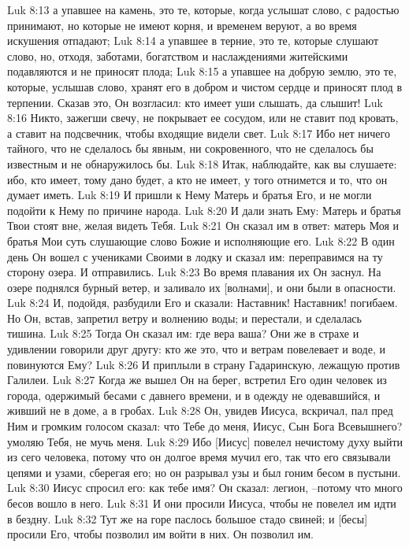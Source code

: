 Luk 8:13  а упавшее на камень, это те, которые, когда услышат слово, с радостью принимают, но которые не имеют корня, и временем веруют, а во время искушения отпадают;
Luk 8:14  а упавшее в терние, это те, которые слушают слово, но, отходя, заботами, богатством и наслаждениями житейскими подавляются и не приносят плода;
Luk 8:15  а упавшее на добрую землю, это те, которые, услышав слово, хранят его в добром и чистом сердце и приносят плод в терпении. Сказав это, Он возгласил: кто имеет уши слышать, да слышит!
Luk 8:16  Никто, зажегши свечу, не покрывает ее сосудом, или не ставит под кровать, а ставит на подсвечник, чтобы входящие видели свет.
Luk 8:17  Ибо нет ничего тайного, что не сделалось бы явным, ни сокровенного, что не сделалось бы известным и не обнаружилось бы.
Luk 8:18  Итак, наблюдайте, как вы слушаете: ибо, кто имеет, тому дано будет, а кто не имеет, у того отнимется и то, что он думает иметь.
Luk 8:19  И пришли к Нему Матерь и братья Его, и не могли подойти к Нему по причине народа.
Luk 8:20  И дали знать Ему: Матерь и братья Твои стоят вне, желая видеть Тебя.
Luk 8:21  Он сказал им в ответ: матерь Моя и братья Мои суть слушающие слово Божие и исполняющие его.
Luk 8:22  В один день Он вошел с учениками Своими в лодку и сказал им: переправимся на ту сторону озера. И отправились.
Luk 8:23  Во время плавания их Он заснул. На озере поднялся бурный ветер, и заливало их [волнами], и они были в опасности.
Luk 8:24  И, подойдя, разбудили Его и сказали: Наставник! Наставник! погибаем. Но Он, встав, запретил ветру и волнению воды; и перестали, и сделалась тишина.
Luk 8:25  Тогда Он сказал им: где вера ваша? Они же в страхе и удивлении говорили друг другу: кто же это, что и ветрам повелевает и воде, и повинуются Ему?
Luk 8:26  И приплыли в страну Гадаринскую, лежащую против Галилеи.
Luk 8:27  Когда же вышел Он на берег, встретил Его один человек из города, одержимый бесами с давнего времени, и в одежду не одевавшийся, и живший не в доме, а в гробах.
Luk 8:28  Он, увидев Иисуса, вскричал, пал пред Ним и громким голосом сказал: что Тебе до меня, Иисус, Сын Бога Всевышнего? умоляю Тебя, не мучь меня.
Luk 8:29  Ибо [Иисус] повелел нечистому духу выйти из сего человека, потому что он долгое время мучил его, так что его связывали цепями и узами, сберегая его; но он разрывал узы и был гоним бесом в пустыни.
Luk 8:30  Иисус спросил его: как тебе имя? Он сказал: легион, --потому что много бесов вошло в него.
Luk 8:31  И они просили Иисуса, чтобы не повелел им идти в бездну.
Luk 8:32  Тут же на горе паслось большое стадо свиней; и [бесы] просили Его, чтобы позволил им войти в них. Он позволил им.
